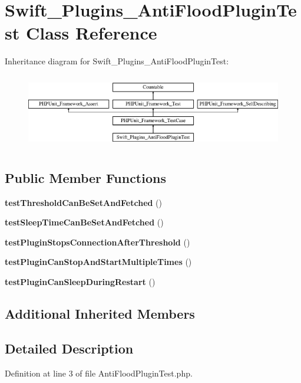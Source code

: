 \section{Swift\+\_\+\+Plugins\+\_\+\+Anti\+Flood\+Plugin\+Test Class Reference}
\label{class_swift___plugins___anti_flood_plugin_test}
Inheritance diagram for Swift\+\_\+\+Plugins\+\_\+\+Anti\+Flood\+Plugin\+Test\+:\begin{figure}[H]
\begin{center}
\leavevmode
\includegraphics[height=3.303835cm]{class_swift___plugins___anti_flood_plugin_test}
\end{center}
\end{figure}
\subsection*{Public Member Functions}
\begin{DoxyCompactItemize}
\item 
{\bf test\+Threshold\+Can\+Be\+Set\+And\+Fetched} ()
\item 
{\bf test\+Sleep\+Time\+Can\+Be\+Set\+And\+Fetched} ()
\item 
{\bf test\+Plugin\+Stops\+Connection\+After\+Threshold} ()
\item 
{\bf test\+Plugin\+Can\+Stop\+And\+Start\+Multiple\+Times} ()
\item 
{\bf test\+Plugin\+Can\+Sleep\+During\+Restart} ()
\end{DoxyCompactItemize}
\subsection*{Additional Inherited Members}


\subsection{Detailed Description}


Definition at line 3 of file Anti\+Flood\+Plugin\+Test.\+php.



